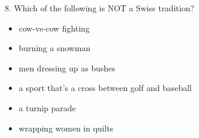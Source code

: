 8. Which of the following is NOT a Swiss tradition?   
\begin{itemize}
      \item cow-vs-cow fighting
      \item burning a snowman
      \item men dressing up as bushes
      \item a sport that's a cross between golf and baseball
      \item a turnip parade
      \item wrapping women in quilts
   \end{itemize}
